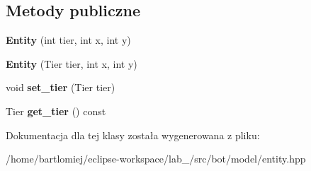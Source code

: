 \subsection*{Metody publiczne}
\begin{DoxyCompactItemize}
\item 
\mbox{\label{classmodel_1_1Entity_a057496c613d4fb3811b5f674457c6184}} 
{\bfseries Entity} (int tier, int x, int y)
\item 
\mbox{\label{classmodel_1_1Entity_a246514b8d15c37188991c7834e9645f5}} 
{\bfseries Entity} (Tier tier, int x, int y)
\item 
\mbox{\label{classmodel_1_1Entity_a3092a544ac1d17cc8a04b0634c6456db}} 
void {\bfseries set\+\_\+tier} (Tier tier)
\item 
\mbox{\label{classmodel_1_1Entity_a28bfcc2457c2bd8e3256ab99f0550155}} 
Tier {\bfseries get\+\_\+tier} () const
\end{DoxyCompactItemize}


Dokumentacja dla tej klasy została wygenerowana z pliku\+:\begin{DoxyCompactItemize}
\item 
/home/bartlomiej/eclipse-\/workspace/lab\+\_/src/bot/model/entity.\+hpp\end{DoxyCompactItemize}
